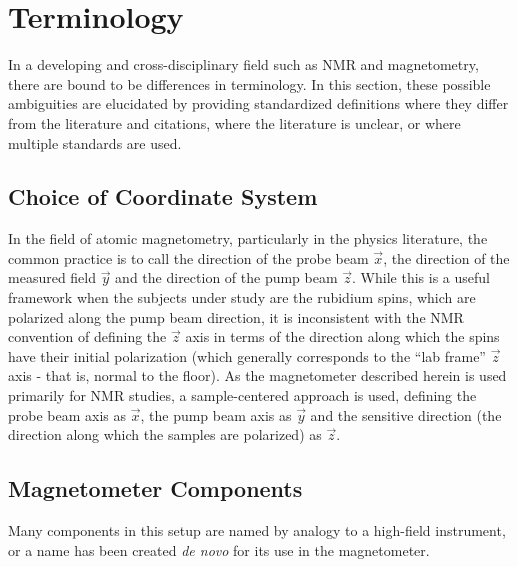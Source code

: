 \documentclass[../PaulGanssle-Thesis.tex]{subfiles}
\begin{document}
\chapter{Terminology}
\label{terminology}
In a developing and cross-disciplinary field such as NMR and magnetometry, there are bound to be differences in terminology. In this section, these possible ambiguities are elucidated by providing standardized definitions where they differ from the literature and citations, where the literature is unclear, or where multiple standards are used.

\section{Choice of Coordinate System}
\label{terminology.coordinates}
In the field of atomic magnetometry, particularly in the physics literature, the common practice is to call the direction of the probe beam $\vec{x}$, the direction of the measured field $\vec{y}$ and the direction of the pump beam $\vec{z}$. While this is a useful framework when the subjects under study are the rubidium spins, which are polarized along the pump beam direction, it is inconsistent with the NMR convention of defining the $\vec{z}$ axis in terms of the direction along which the spins have their initial polarization (which generally corresponds to the ``lab frame'' $\vec{z}$ axis - that is, normal to the floor). As the magnetometer described herein is used primarily for NMR studies, a sample-centered approach is used, defining the probe beam axis as $\vec{x}$, the pump beam axis as $\vec{y}$ and the sensitive direction (the direction along which the samples are polarized) as $\vec{z}$.

\section{Magnetometer Components}
\label{terminology.components}
Many components in this setup are named by analogy to a high-field instrument, or a name has been created \emph{de novo} for its use in the magnetometer.
\end{document}
